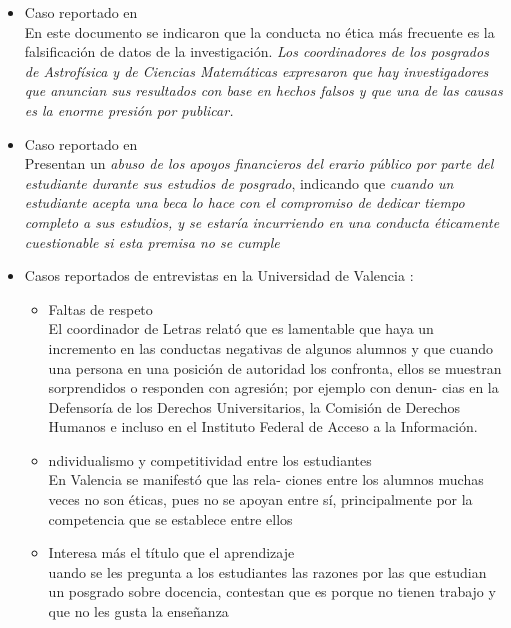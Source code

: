 \begin{itemize}
    \item Caso reportado en \cite{comstock_2013}\\
    En este documento se indicaron que la conducta no ética más frecuente es la falsificación de datos de la investigación.
    \textit{Los coordinadores de los posgrados de Astrofísica y de Ciencias Matemáticas expresaron
    que hay investigadores que anuncian sus resultados con base en hechos falsos y que una de las
    causas es la enorme presión por publicar.}
    \item Caso reportado en \cite{Aluja2004}\\
    Presentan un \textit{abuso de los apoyos financieros del
    erario público por parte del estudiante durante sus estudios de posgrado}, indicando que \textit{
        cuando un estudiante acepta una beca lo hace con el compromiso de dedicar tiempo completo a sus
estudios, y se estaría incurriendo en una conducta éticamente cuestionable si esta premisa no
se cumple}
\item Casos reportados de entrevistas en la Universidad de Valencia \cite{HirschAdler2016}:
\begin{itemize}
    \item Faltas de respeto\\
    El coordinador de Letras relató que es lamentable que haya un incremento en las conductas
    negativas de algunos alumnos y que cuando una persona en una posición de autoridad los confronta, ellos se muestran sorprendidos o responden con agresión; por ejemplo con denun-
    cias en la Defensoría de los Derechos Universitarios, la Comisión de Derechos Humanos e
    incluso en el Instituto Federal de Acceso a la Información.
    \item ndividualismo y competitividad entre los estudiantes\\
    En Valencia se manifestó que las rela-
ciones entre los alumnos muchas veces no son éticas, pues no se apoyan entre sí, principalmente
por la competencia que se establece entre ellos
    \item Interesa más el título que el aprendizaje\\
    uando se les pregunta a los estudiantes las razones
por las que estudian un posgrado sobre docencia, contestan que es porque no tienen trabajo
y que no les gusta la enseñanza
\end{itemize}
\end{itemize}
